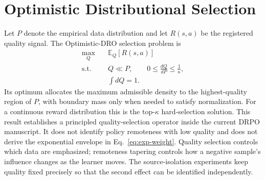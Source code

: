 \section{Optimistic Distributional Selection}
\label{app:optimistic-dro}

Let $P$ denote the empirical data distribution and let $R(s,a)$ be the registered quality signal. The Optimistic-DRO selection problem is
\begin{equation}
\begin{aligned}
\max_Q\quad &\mathbb E_Q[R(s,a)]\\
\text{s.t.}\quad &Q\ll P,\qquad 0\le \frac{dQ}{dP}\le \frac{1}{\kappa},\\
&\int dQ=1.
\end{aligned}
\label{eq:optimistic-dro}
\end{equation}
Its optimum allocates the maximum admissible density to the highest-quality region of $P$, with boundary mass only when needed to satisfy normalization. For a continuous reward distribution this is the top-$\kappa$ hard-selection solution. This result establishes a principled quality-selection operator inside the current DRPO manuscript. It does not identify policy remoteness with low quality and does not derive the exponential envelope in Eq.~\eqref{eq:exp-weight}. Quality selection controls which data are emphasized; remoteness tapering controls how a negative sample's influence changes as the learner moves. The source-isolation experiments keep quality fixed precisely so that the second effect can be identified independently.
